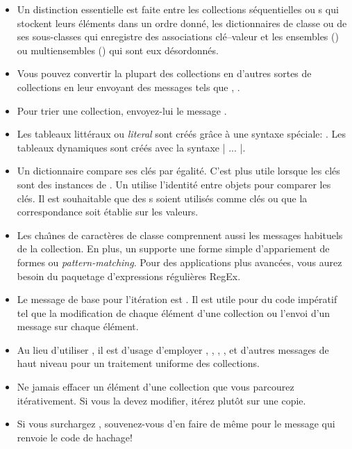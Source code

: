 \documentclass[a4paper,10pt,twoside]{book}
\begin{document}
\begin{itemize}
  \item Un distinction essentielle est faite entre les collections s\'equentielles ou 
s qui stockent leurs \'el\'ements dans un ordre
donn\'e, 
les dictionnaires de classe ou de ses sous-classes qui
enregistre des associations cl\'e--valeur et les ensembles 
() ou multiensembles () qui sont eux d\'esordonn\'es.
  \item Vous pouvez convertir la plupart des collections en d'autres sortes de 
collections en leur envoyant des messages tels que ,  \etc.
  \item Pour trier une collection, envoyez-lui le message .
  \item Les tableaux litt\'eraux ou \emph{literal}  sont cr\'e\'es 
gr\^ace \`a une syntaxe sp\'eciale: .  Les tableaux dynamiques
sont cr\'e\'es avec la syntaxe \ct|{ ... }|.
  \item Un dictionnaire  compare ses cl\'es par \'egalit\'e.
C'est plus utile lorsque les cl\'es sont des instances de . 
Un  utilise l'identit\'e entre objets pour comparer les cl\'es. Il est souhaitable que des s soient utilis\'es comme cl\'es ou que la correspondance soit \'etablie sur les valeurs.
  \item Les cha\^{\i}nes de caract\`eres de classe  comprennent
aussi les messages habituels de la collection. En plus, un  
supporte une forme simple d'appariement de formes ou \emph{pattern-matching}. 
Pour des applications plus avanc\'ees, vous aurez besoin du paquetage d'expressions r\'eguli\`eres RegEx.
  \item Le message de base pour l'it\'eration est . Il est 
utile pour du code imp\'eratif tel que la modification de chaque \'el\'ement d'une collection ou l'envoi d'un message sur chaque \'el\'ement.
  \item Au lieu d'utiliser , il est d'usage d'employer , , , ,  et d'autres messages de haut niveau pour un traitement uniforme des collections.
  \item Ne jamais effacer un \'el\'ement d'une collection que vous parcourez it\'erativement. Si vous la devez modifier, it\'erez plut\^ot sur une copie.
  \item Si vous surchargez \ct{=}, souvenez-vous d'en faire de m\^eme pour le message  
qui renvoie le code de hachage!
\end{itemize}

\ifx\wholebook\relax\else
   
   
\end{document}

